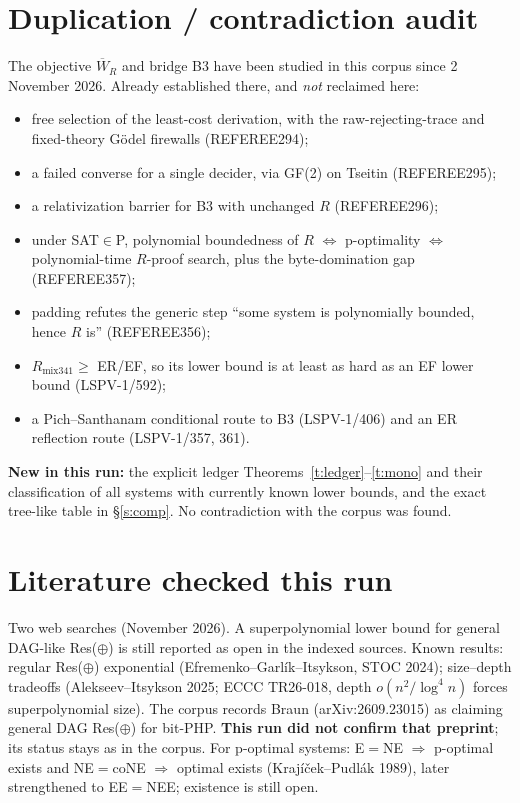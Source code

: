 \documentclass[11pt]{article}
\begin{document}
\section{Duplication / contradiction audit}
The objective $\overline W_R$ and bridge B3 have been studied in this corpus since
2 November 2026. Already established there, and \emph{not} reclaimed here:
\begin{itemize}
\item free selection of the least-cost derivation, with the raw-rejecting-trace
and fixed-theory Gödel firewalls (REFEREE294);
\item a failed converse for a single decider, via GF(2) on Tseitin (REFEREE295);
\item a relativization barrier for B3 with unchanged $R$ (REFEREE296);
\item under SAT$\in$P, polynomial boundedness of $R$ $\Leftrightarrow$ p-optimality
$\Leftrightarrow$ polynomial-time $R$-proof search, plus the byte-domination gap (REFEREE357);
\item padding refutes the generic step ``some system is polynomially bounded, hence $R$ is'' (REFEREE356);
\item $R_{\mathrm{mix341}}\ge$ ER/EF, so its lower bound is at least as hard as an EF lower bound (LSPV-1/592);
\item a Pich--Santhanam conditional route to B3 (LSPV-1/406) and an ER reflection route (LSPV-1/357, 361).
\end{itemize}
\textbf{New in this run:} the explicit ledger Theorems~\ref{t:ledger}--\ref{t:mono} and their
classification of all systems with currently known lower bounds, and the exact
tree-like table in \S\ref{s:comp}. No contradiction with the corpus was found.

\section{Literature checked this run}
Two web searches (November 2026). A superpolynomial lower bound for general DAG-like
Res($\oplus$) is still reported as open in the indexed sources. Known results: regular
Res($\oplus$) exponential (Efremenko--Garlík--Itsykson, STOC 2024); size--depth tradeoffs
(Alekseev--Itsykson 2025; ECCC TR26-018, depth $o(n^2/\log^4 n)$ forces superpolynomial size).
The corpus records Braun (arXiv:2609.23015) as claiming general DAG Res($\oplus$) for
bit-PHP. \textbf{This run did not confirm that preprint}; its status stays as in the corpus.
For p-optimal systems: E$=$NE $\Rightarrow$ p-optimal exists and NE$=$coNE $\Rightarrow$
optimal exists (Krajíček--Pudlák 1989), later strengthened to EE$=$NEE; existence is still open.
\end{document}
